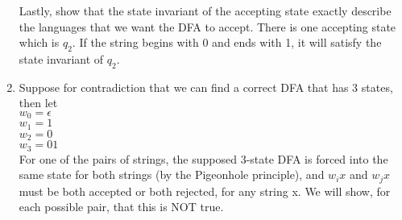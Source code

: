 \documentclass[12pt]{article}
\begin{document}
\begin{enumerate}
Lastly, show that the state invariant of the accepting state exactly describe the languages that we want the DFA to accept. There is one accepting state which is $q_2$. If the string begins with 0 and ends with 1, it will satisfy the state invariant of $q_2$.\\
\item
Suppose for contradiction that we can find a correct DFA that has 3 states, then let\\
$w_{0}=\epsilon$\\
$w_{1}=1$\\
$w_{2}=0$\\
$w_{3}=01$\\
For one of the pairs of strings, the supposed 3-state DFA is forced into the same state for both strings (by the
Pigeonhole principle), and $w_ix$ and $w_jx$ must be both accepted or both rejected, for any string x. We will show, for each possible pair, that this is NOT true.\\\\


\end{enumerate}
\end{document}
